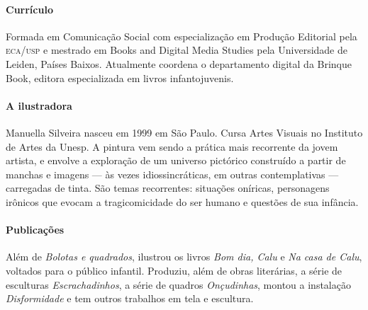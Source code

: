 \documentclass[11pt]{extarticle}
\begin{document}
\paragraph{Currículo} 
Formada em Comunicação Social com 
especialização em Produção Editorial pela \textsc{eca/usp} 
e mestrado em Books and Digital Media Studies pela 
Universidade de Leiden, Países Baixos.
Atualmente coordena o departamento digital da Brinque 
Book, editora especializada em livros infantojuvenis.


\paragraph{A ilustradora}
Manuella Silveira nasceu em 1999 em São Paulo. Cursa Artes Visuais no Instituto de Artes da Unesp. A pintura vem sendo a prática mais recorrente da jovem artista, e envolve a exploração de um universo pictórico construído a partir de manchas e imagens --- às vezes idiossincráticas, em outras contemplativas --- carregadas de tinta. São temas recorrentes: situações oníricas, personagens irônicos que evocam a tragicomicidade do ser humano e questões de sua infância.


\paragraph{Publicações}
Além de \textit{Bolotas e quadrados}, ilustrou os livros \emph{Bom dia, Calu} e \emph{Na casa de Calu}, voltados para o público infantil. Produziu, além de obras literárias, a série de esculturas \textit{Escrachadinhos}, a série de quadros \textit{Onçudinhas}, montou a instalação \textit{Disformidade} e tem outros trabalhos em tela e escultura.


\end{document}
